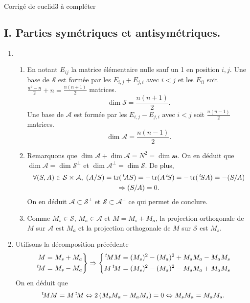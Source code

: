 Corrigé de euclid3 à compléter
\subsection*{I. Parties symétriques et antisymétriques.}
\begin{enumerate}
 \item 
\begin{enumerate}
 \item En notant $E_{i j}$ la matrice élémentaire nulle sauf un 1 en position $i,j$. Une base de $\mathcal{S}$ est formée par les $E_{i,j} + E_{j,i}$ avec $i < j$ et les $E_{i i}$ soit $\frac{n^2-n}{2}+n=\frac{n(n+1)}{2}$ matrices.
\[
 \dim \mathcal{S} = \frac{n(n+1)}{2}.
\]
 Une base de $\mathcal{A}$ est formée par les $E_{i,j} - E_{j,i}$ avec $i < j$ soit $\frac{n(n-1)}{2}$ matrices.
\[
 \dim \mathcal{A} = \frac{n(n-1)}{2}.
\]

 \item Remarquons que $\dim \mathcal{A} + \dim \mathcal{A} = N^2 = \dim \mathcal{m}$. On en déduit que $\dim \mathcal{A} = \dim \mathcal{S}^\bot$ et $\dim \mathcal{A}^\bot = \dim \mathcal{S}$. De plus,
\begin{multline*}
\forall (S,A) \in \mathcal{S} \times \mathcal{A}, \;
 (A/S) = \operatorname{tr}(\,\mathstrut^t\!{A}S) = - \operatorname{tr}(A\,\mathstrut^t\!{S}) = -\operatorname{tr}(\,\mathstrut^t\!{S}A) = - (S/A)\\
 \Rightarrow (S/A) = 0. 
\end{multline*}
On en déduit $\mathcal{A} \subset \mathcal{S}^\bot$ et $\mathcal{S} \subset \mathcal{A}^\bot$ ce qui permet de conclure.

 \item Comme $M_s \in \mathcal{S}$, $M_a \in \mathcal{A}$ et $M = M_s + M_a$, la projection orthogonale de $M$ sur $\mathcal{A}$ est $M_a$ et la projection orthogonale de $M$ sur $\mathcal{S}$ est $M_s$. 
\end{enumerate}

 \item Utilisons la décomposition précédente
\[
\left. 
\begin{aligned}
 M &= M_s + M_a \\ \,\mathstrut^t\!{M} &= M_s - M_a
\end{aligned}
\right\rbrace 
\Rightarrow
\left\lbrace 
\begin{aligned}
 \,\mathstrut^t\!{M} M &= (M_s)^2 - (M_a)^2 + M_s M_a - M_a M_s \\
 M \,\mathstrut^t\!{M} &= (M_s)^2 - (M_a)^2 - M_s M_a + M_a M_s
\end{aligned}
\right. 
\]
On en déduit que
\[
 \,\mathstrut^t\!{M} M = M \,\mathstrut^t\!{M} \Leftrightarrow 2\left( M_s M_a - M_a M_s\right) = 0 \Leftrightarrow M_s M_a = M_a M_s.
\]


\end{enumerate}
